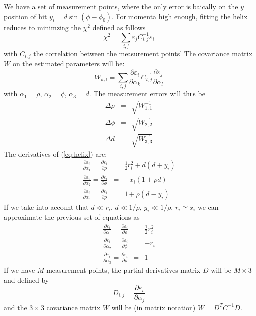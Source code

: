 \documentclass[10pt,a4paper]{article}
\begin{document}
We have a set of measurement points, where the only error is baically on the $y$ position of hit
$y_i = d \sin (\phi-\phi_0)$. For momenta high enough,
fitting the helix reduces to minimzing the $\chi^2$ defined as follows
\begin{equation}
\label{eq:helix}
\chi^2 = \sum_{i,j} \varepsilon_j C^{-1}_{i,j} \varepsilon_i
\end{equation}
with $C_{i,j}$ the correlation between the measurement points' 
The covariance matrix $W$ on the estimated parameters will be:
\begin{equation}
W_{k,l} = \sum_{i,j} \frac { \partial \varepsilon_i} {\partial \alpha_k} C^{-1}_{i,j}  \frac { \partial \varepsilon_j} {\partial \alpha_l}
\end{equation}
with $\alpha_1 = \rho$, $\alpha_2 = \phi$, $\alpha_3 = d$. The measurement errors will thus be
\begin{eqnarray}
\Delta \rho &=& \sqrt{W_{1,1}^{-1}} \nonumber \\
\Delta \phi &=& \sqrt{W_{2,2}^{-1}} \nonumber \\
\Delta d &=& \sqrt{W_{3,3}^{-1}} \nonumber
\end{eqnarray}
The derivatives of (\ref{eq:helix}) are:
\begin{eqnarray}
\frac { \partial \varepsilon_i} {\partial \alpha_1} =
\frac { \partial \varepsilon_i} {\partial \rho} &=& \frac 1 2 r_i^2 + d (d+y_i) \nonumber \\
\frac { \partial \varepsilon_i} {\partial \alpha_2} =
\frac { \partial \varepsilon_i} {\partial \phi} &=& - x_i (1+\rho d) \nonumber \\
\frac { \partial \varepsilon_i} {\partial \alpha_3} =
\frac { \partial \varepsilon_i} {\partial \rho} &=& 1 + \rho (d - y_i) \nonumber 
\end{eqnarray}
If we take into account that $d \ll r_i$, $d \ll 1/\rho$, $y_i \ll 1/\rho$, $r_i \simeq x_i$ we can approximate the previous set of equations as
\begin{eqnarray}
\frac { \partial \varepsilon_i} {\partial \alpha_1} =
\frac { \partial \varepsilon_i} {\partial \rho} &=& \frac 1 2 r_i^2 \nonumber \\
\frac { \partial \varepsilon_i} {\partial \alpha_2} =
\frac { \partial \varepsilon_i} {\partial \phi} &=& - r_i  \nonumber \\
\frac { \partial \varepsilon_i} {\partial \alpha_3} =
\frac { \partial \varepsilon_i} {\partial \rho} &=& 1 \nonumber 
\end{eqnarray}
If we have $M$ measurement points, the partial derivatives matrix $D$ will be $M\times 3$ and defined by
\begin{equation}
D_{i,j} = \frac { \partial \varepsilon_i} {\partial \alpha_j}
\end{equation}
and the $3\times 3$ covariance matrix $W$ will be (in matrix notation) $W=D^{T}C^{-1}D$.
\end{document}
